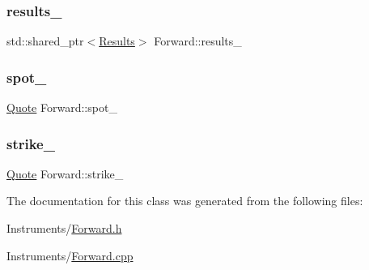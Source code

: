 \hypertarget{class_forward_abead12e748980177fb67f98bcffbf817}{}\label{class_forward_abead12e748980177fb67f98bcffbf817} 
\subsubsection{\texorpdfstring{results\+\_\+}{results\_}}
{\footnotesize\ttfamily std\+::shared\+\_\+ptr$<$\hyperlink{class_forward_1_1_results}{Results}$>$ Forward\+::results\+\_\+}

\hypertarget{class_forward_a362d0396ceda462e504f77120339f8b0}{}\label{class_forward_a362d0396ceda462e504f77120339f8b0} 
\subsubsection{\texorpdfstring{spot\+\_\+}{spot\_}}
{\footnotesize\ttfamily \hyperlink{_name_def_8h_a642a6c5fd87319d922637de0e0bb0305}{Quote} Forward\+::spot\+\_\+\hspace{0.3cm}{\ttfamily [private]}}

\hypertarget{class_forward_a17c32d0a673c13fd92288b1720a43b76}{}\label{class_forward_a17c32d0a673c13fd92288b1720a43b76} 
\subsubsection{\texorpdfstring{strike\+\_\+}{strike\_}}
{\footnotesize\ttfamily \hyperlink{_name_def_8h_a642a6c5fd87319d922637de0e0bb0305}{Quote} Forward\+::strike\+\_\+\hspace{0.3cm}{\ttfamily [private]}}



The documentation for this class was generated from the following files\+:\begin{DoxyCompactItemize}
\item 
Instruments/\hyperlink{_forward_8h}{Forward.\+h}\item 
Instruments/\hyperlink{_forward_8cpp}{Forward.\+cpp}\end{DoxyCompactItemize}

